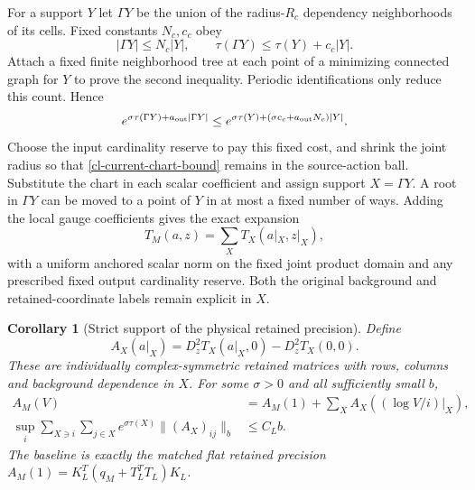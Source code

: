 \documentclass[11pt]{article}
\newtheorem{corollary}[theorem]{Corollary}
\theoremstyle{remark}
\begin{document}
For a support $Y$ let $\Gamma Y$ be the union of the radius-$R_c$
dependency neighborhoods of its cells. Fixed constants $N_c,c_c$ obey
\begin{equation}
 |\Gamma Y|\le N_c|Y|,\qquad
 \tau(\Gamma Y)\le\tau(Y)+c_c|Y|.                           \label{cl-support-enlargement}
\end{equation}
Attach a fixed finite neighborhood tree at each point of a minimizing
connected graph for $Y$ to prove the second inequality. Periodic
identifications only reduce this count. Hence
\begin{equation}
 e^{\sigma\tau(\Gamma Y)+a_{\rm out}|\Gamma Y|}
 \le e^{\sigma\tau(Y)+(\sigma c_c+a_{\rm out}N_c)|Y|}.       \label{cl-composition-weight}
\end{equation}
Choose the input cardinality reserve to pay this fixed cost, and shrink
the joint radius so that \eqref{cl-current-chart-bound} remains in the
source-action ball. Substitute the chart in each scalar coefficient and
assign support $X=\Gamma Y$. A root in $\Gamma Y$ can be moved to a
point of $Y$ in at most a fixed number of ways. Adding the local gauge
coefficients gives the exact expansion
\begin{equation}
 T_M(a,z)=\sum_X T_X(a|_X,z|_X),                             \label{cl-pulled-support-expansion}
\end{equation}
with a uniform anchored scalar norm on the fixed joint product domain
and any prescribed fixed output cardinality reserve. Both the original
background and retained-coordinate labels remain explicit in $X$.

\begin{corollary}[Strict support of the physical retained precision]
\label{cl-precision-theorem}
Define
\begin{equation}
 A_X(a|_X)=D_z^2T_X(a|_X,0)-D_z^2T_X(0,0).                   \label{cl-precision-coefficients}
\end{equation}
These are individually complex-symmetric retained matrices with rows,
columns and background dependence in $X$. For some $\sigma>0$ and all
sufficiently small $b$,
\begin{align}
 A_M(V)&=A_M(1)+\sum_X A_X((\log V/i)|_X),                  \label{cl-precision-expansion}\\
 \sup_i\sum_{X\ni i}\sum_{j\in X}
 e^{\sigma\tau(X)}\|(A_X)_{ij}\|_b&\le C_L b.             \label{cl-precision-norm}
\end{align}
The baseline is exactly the matched flat retained precision
$A_M(1)=K_L^T(q_M+T_L^TT_L)K_L$.
\end{corollary}
\end{document}

